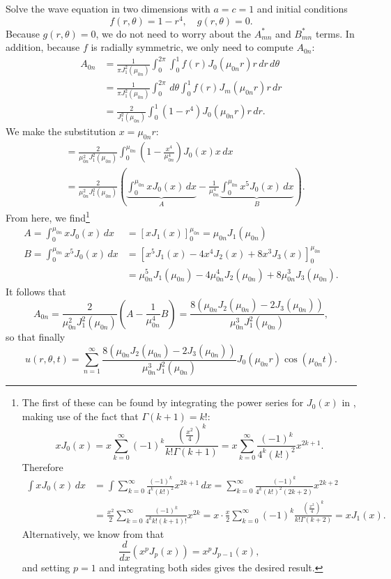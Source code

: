 \begin{eg}
	Solve the wave equation in two dimensions with $a=c=1$ and initial conditions
	\[
	f(r,\theta)=1-r^4, \quad g(r,\theta)=0.
	\]
	Because $g(r,\theta)=0$, we do not need to worry about the $A_{mn}^*$ and $B_{mn}^*$ terms. In addition, because $f$ is radially symmetric, we only need to compute $A_{0n}$:
	\begin{align*}
		A_{0n} &= \frac{1}{\pi J_1^2(\mu_{0n})} \int_0^{2\pi} \int_0^1 f(r) J_0(\mu_{0n}r) r \,dr\,d\theta \\
		&= \frac{1}{\pi J_1^2(\mu_{0n})} \int_0^{2\pi} \,d\theta \int_0^1 f(r) J_m(\mu_{0n}r) r \,dr \\
		&= \frac{2}{J_1^2(\mu_{0n})} \int_0^1 (1-r^4) J_0(\mu_{0n}r) r \,dr.
	\end{align*}
	We make the substitution $x = \mu_{0n}r$:
	\begin{align*}
		&= \frac{2}{\mu_{0n}^2 J_1^2(\mu_{0n})} \int_0^{\mu_{0n}} \left( 1-\frac{x^4}{\mu_{0n}^4} \right) J_0(x) x \,dx \\
		&= \frac{2}{\mu_{0n}^2 J_1^2(\mu_{0n})} \left( \underbrace{\int_0^{\mu_{0n}} xJ_0(x) \,dx}_{A} - \frac{1}{\mu_{0n}^4} \underbrace{\int_0^{\mu_{0n}} x^5J_0(x) \,dx}_{B}\right). 
	\end{align*}
	From here, we find\footnote{The first of these can be found by integrating the power series for $J_0(x)$ in , making use of the fact that $\Gamma(k+1)=k!$:
		\[
		xJ_0(x) = x \sum_{k=0}^{\infty} (-1)^k\frac{(\frac{x^2}{4})^k}{k!\Gamma(k+1)} = x \sum_{k=0}^{\infty} \frac{(-1)^k}{4^k(k!)^2}x^{2k+1}.
		\]
		Therefore
		\begin{align*}
			\int xJ_0(x) \,dx &= \int \sum_{k=0}^{\infty} \frac{(-1)^k}{4^k(k!)^2}x^{2k+1} \,dx = \sum_{k=0}^{\infty} \frac{(-1)^k}{4^k(k!)^2(2k+2)}x^{2k+2} \\
			&= \frac{x^2}{2} \sum_{k=0}^{\infty} \frac{(-1)^k}{4^kk!(k+1)!}x^{2k} = x \cdot \frac{x}{2} \sum_{k=0}^{\infty} (-1)^k\frac{(\frac{x^2}{4})^k}{k!\Gamma(k+2)} = xJ_1(x).
		\end{align*}
		Alternatively, we know from \cite[Eq. 9.1.30]{olver} that
		\[
		\frac{d}{dx}\left(x^pJ_p(x)\right) = x^pJ_{p-1}(x),
		\]
		and setting $p=1$ and integrating both sides gives the desired result.}
	\begin{align*}
		A = \int_0^{\mu_{0n}} xJ_0(x) \,dx &= \left[xJ_1(x)\right]_0^{\mu_{0n}} = \mu_{0n}J_1(\mu_{0n}) \\
		B = \int_0^{\mu_{0n}} x^5J_0(x) \,dx &= \left[x^5J_1(x) - 4x^4J_2(x) + 8x^3J_3(x)\right]_0^{\mu_{0n}} \\
		&= \mu_{0n}^5J_1(\mu_{0n}) - 4\mu_{0n}^4J_2(\mu_{0n}) + 8\mu_{0n}^3J_3(\mu_{0n}).
	\end{align*}
	It follows that
	\[
	A_{0n} = \frac{2}{\mu_{0n}^2 J_1^2(\mu_{0n})} \left(A - \frac{1}{\mu_{0n}^4}B\right) = \frac{8\left(\mu_{0n}J_2(\mu_{0n}) - 2J_3(\mu_{0n})\right)}{\mu_{0n}^3J_1^2(\mu_{0n})},
	\]
	so that finally
	\[
	u(r,\theta,t) = \sum_{n=1}^{\infty} \frac{8\left(\mu_{0n}J_2(\mu_{0n}) - 2J_3(\mu_{0n})\right)}{\mu_{0n}^3J_1^2(\mu_{0n})} J_0(\mu_{0n}r)\cos(\mu_{0n}t).
	\]
\end{eg}
